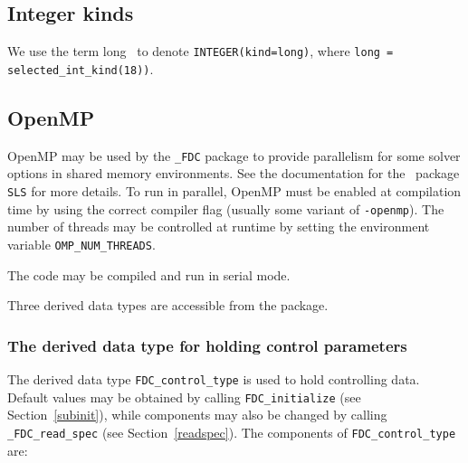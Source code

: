 \documentclass{galahad}
\newcommand{\packagename}{FDC}
\newcommand{\fullpackagename}{\libraryname\_\-\packagename}
\begin{document}

\subsection{Integer kinds}\label{Integer kinds}
We use the term
long \integer\ to denote {\tt INTEGER\-(kind=long)}, where
{\tt long = selected\_int\_kind(18))}.


\subsection{OpenMP}
OpenMP may be used by the {\tt \fullpackagename} package to provide
parallelism for some solver options in shared memory environments.
See the documentation for the \galahad\ package {\tt SLS} for more details.
To run in parallel, OpenMP
must be enabled at compilation time by using the correct compiler flag
(usually some variant of {\tt -openmp}).
The number of threads may be controlled at runtime
by setting the environment variable {\tt OMP\_NUM\_THREADS}.

\noindent
The code may be compiled and run in serial mode.


\galtypes
Three derived data types are accessible from the package.


\subsubsection{The derived data type for holding control
 parameters}\label{typecontrol}
The derived data type
{\tt \packagename\_control\_type}
is used to hold controlling data. Default values may be obtained by calling
{\tt \packagename\_initialize}
(see Section~\ref{subinit}),
while components may also be changed by calling
{\tt \fullpackagename\_read\-\_spec}
(see Section~\ref{readspec}).
The components of
{\tt \packagename\_control\_type}
are:
\end{document}

